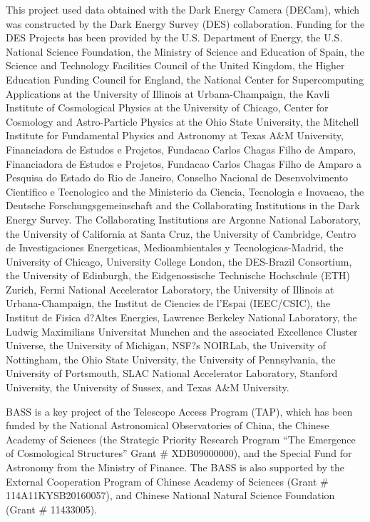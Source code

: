 \documentclass[twocolumn,apj,iop,tighten]{emulateapj2}
\begin{document}
This project used data obtained with the Dark Energy Camera (DECam), which was constructed by the Dark Energy Survey (DES) collaboration. Funding for the DES Projects has been provided by the U.S. Department of Energy, the U.S. National Science Foundation, the Ministry of Science and Education of Spain, the Science and Technology Facilities Council of the United Kingdom, the Higher Education Funding Council for England, the National Center for Supercomputing Applications at the University of Illinois at Urbana-Champaign, the Kavli Institute of Cosmological Physics at the University of Chicago, Center for Cosmology and Astro-Particle Physics at the Ohio State University, the Mitchell Institute for Fundamental Physics and Astronomy at Texas A\&M University, Financiadora de Estudos e Projetos, Fundacao Carlos Chagas Filho de Amparo, Financiadora de Estudos e Projetos, Fundacao Carlos Chagas Filho de Amparo a Pesquisa do Estado do Rio de Janeiro, Conselho Nacional de Desenvolvimento Cientifico e Tecnologico and the Ministerio da Ciencia, Tecnologia e Inovacao, the Deutsche Forschungsgemeinschaft and the Collaborating Institutions in the Dark Energy Survey. The Collaborating Institutions are Argonne National Laboratory, the University of California at Santa Cruz, the University of Cambridge, Centro de Investigaciones Energeticas, Medioambientales y Tecnologicas-Madrid, the University of Chicago, University College London, the DES-Brazil Consortium, the University of Edinburgh, the Eidgenossische Technische Hochschule (ETH) Zurich, Fermi National Accelerator Laboratory, the University of Illinois at Urbana-Champaign, the Institut de Ciencies de l'Espai (IEEC/CSIC), the Institut de Fisica d?Altes Energies, Lawrence Berkeley National Laboratory, the Ludwig Maximilians Universitat Munchen and the associated Excellence Cluster Universe, the University of Michigan, NSF?s NOIRLab, the University of Nottingham, the Ohio State University, the University of Pennsylvania, the University of Portsmouth, SLAC National Accelerator Laboratory, Stanford University, the University of Sussex, and Texas A\&M University.

BASS is a key project of the Telescope Access Program (TAP), which has been funded by the National Astronomical Observatories of China, the Chinese Academy of Sciences (the Strategic Priority Research Program ``The Emergence of Cosmological Structures'' Grant \# XDB09000000), and the Special Fund for Astronomy from the Ministry of Finance. The BASS is also supported by the External Cooperation Program of Chinese Academy of Sciences (Grant \# 114A11KYSB20160057), and Chinese National Natural Science Foundation (Grant \# 11433005).
\end{document}
